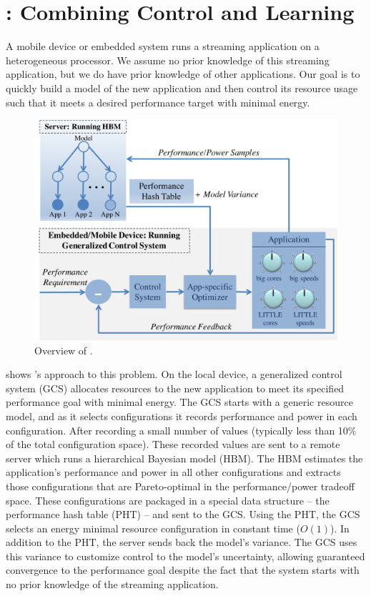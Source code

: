 \section{\SYSTEM{}: Combining Control and Learning}
\label{sec:framework}
A mobile device or embedded system runs a streaming application on a
heterogeneous processor.  We assume no prior knowledge of this
streaming application, but we do have prior knowledge of other
applications.  Our goal is to quickly build a model of the new
application and then control its resource usage such that it meets a
desired performance target with minimal energy.

\begin{figure}
\includegraphics[width=\columnwidth]{figures/ControlLearning.pdf}
\caption{Overview of \SYSTEM{}.} 
\label{fig:overview}
\end{figure}

 shows \SYSTEM{}'s approach to this problem.  On
the local device, a generalized control system (GCS) allocates
resources to the new application to meet its specified performance
goal with minimal energy.  The GCS starts with a generic resource
model, and as it selects configurations it records performance and
power in each configuration.  After recording a small number of values
(typically less than 10\% of the total configuration space).  These
recorded values are sent to a remote server which runs a hierarchical
Bayesian model (HBM).  The HBM estimates the application's performance
and power in all other configurations and extracts those
configurations that are Pareto-optimal in the performance/power
tradeoff space.  These configurations are packaged in a special data
structure -- the performance hash table (PHT) -- and sent to the GCS.
Using the PHT, the GCS selects an energy minimal resource
configuration in constant time ($O(1)$).  In addition to the PHT, the
server sends back the model's variance.  The GCS uses this variance to
customize control to the model's uncertainty, allowing guaranteed
convergence to the performance goal despite the fact that the system
starts with no prior knowledge of the streaming application.

